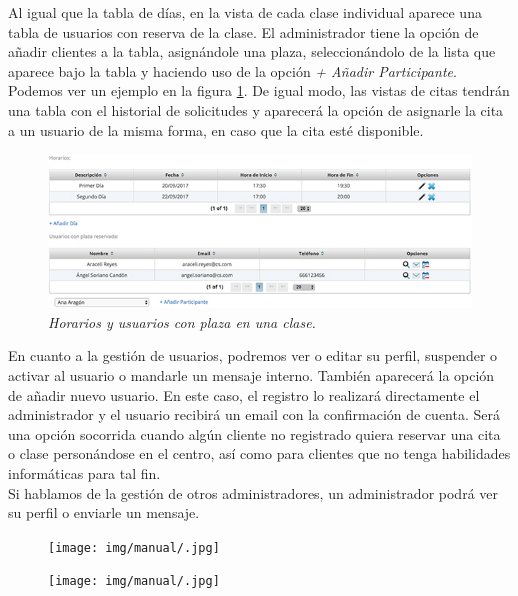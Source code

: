 Al igual que la tabla de días, en la vista de cada clase individual aparece una tabla de usuarios con reserva de la clase. El administrador tiene la opción de añadir clientes a la tabla, asignándole una plaza, seleccionándolo de la lista que aparece bajo la tabla y haciendo uso de la opción \textit{+ Añadir Participante}. Podemos ver un ejemplo en la figura \ref{fig:horarios-y-usuarios-clase}. De igual modo, las vistas de citas tendrán una tabla con el historial de solicitudes y aparecerá la opción de asignarle la cita a un usuario de la misma forma, en caso que la cita esté disponible. \\

\begin{figure}
\centering
  \includegraphics[scale=.60]{img/manual/horarios-y-usuarios-clase.jpg}
  \caption{\textit{Horarios y usuarios con plaza en una clase.}}
  \label{fig:horarios-y-usuarios-clase}
\end{figure}

En cuanto a la gestión de usuarios, podremos ver o editar su perfil, suspender o activar al usuario o mandarle un mensaje interno. También aparecerá la opción de añadir nuevo usuario. En este caso, el registro lo realizará directamente el administrador y el usuario recibirá un email con la confirmación de cuenta. Será una opción socorrida cuando algún cliente no registrado quiera reservar una cita o clase personándose en el centro, así como para clientes que no tenga habilidades informáticas para tal fin. \\ 

Si hablamos de la gestión de otros administradores, un administrador podrá ver su perfil o enviarle un mensaje. \\





\begin{figure}
\centering
  \texttt{[image: img/manual/.jpg]}
  \caption{\textit{}}
  \label{fig:}
\end{figure}


\begin{figure}
\centering
  \texttt{[image: img/manual/.jpg]}
  \caption{\textit{}}
  \label{fig:}
\end{figure}






